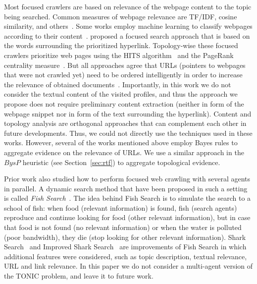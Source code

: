 \documentclass[journal]{IEEEtran}
\begin{document}
Most focused crawlers are based on relevance of the webpage content to the topic being searched. Common measures of webpage relevance are TF/IDF, cosine similarity, and others~\cite{diligenti2000focused,menczer2001evaluating}. 
Some works employ machine learning to classify webpages according to their content~\cite{chakrabarti1999focused}. 
 proposed a focused search approach that is based on the words surrounding the prioritized hyperlink.  
Topology-wise these focused crawlers prioritize web pages using the HITS algorithm~\cite{kleinberg1999authoritative} and the PageRank centrality measure~\cite{almpanidis2007combining}. 
But all approaches agree that URLs (pointers to webpages that were not crawled yet) need to be ordered intelligently in order to increase the relevance of obtained documents~\cite{cho1998efficient}. Importantly, in this work we do not consider the textual content of the visited profiles, and thus the approach we propose does not require preliminary content extraction (neither in form of the webpage snippet nor in form of the text surrounding the hyperlink). 
Content and topology analysis are orthogonal approaches that can complement each other in future developments. Thus, we could not directly use the techniques used in these works. However, several of the works mentioned above employ Bayes rules to aggregate evidence on the relevance of URLs. We use a similar approach in the \(BysP\) heuristic (see Section~\ref{sec:rtf}) to aggregate topological evidence. 


Prior work also studied how to perform focused web crawling with several agents in parallel. A dynamic search method that have been proposed in such a setting is called {\em Fish Search}~\cite{de1994searching}. The idea behind Fish Search is to simulate the search to a school of fish: when food (relevant information) is found, fish (search agents) reproduce and continue looking for food (other relevant information), but in case that food is not found (no relevant information) or when the water is polluted (poor bandwidth), they die (stop looking for other relevant information). Shark Search~\cite{hersovici1998shark} and Improved Shark Search~\cite{chen2007improved} are improvements of Fish Search in which additional features were considered, such as topic description, textual relevance, URL and link relevance. 
In this paper we do not consider a multi-agent version of the TONIC problem, and leave it to future work. 
\end{document}
